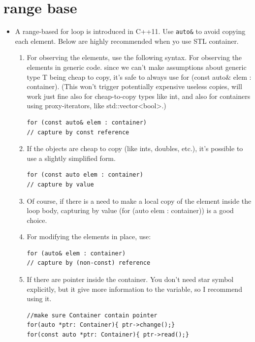 \documentclass[a4paper,11pt,twoside]{book}
\begin{document}
\section{range base}
\begin{itemize}
	
	\item A range-based for loop is introduced in C++11. Use \texttt{auto\&} to avoid copying each element. Below are highly recommended when yo use STL container.
	
	\begin{enumerate}
		\item For observing the elements, use the following syntax. For observing the elements in generic code. since we can't make assumptions about generic type T being cheap to copy, it's safe to always use for (const auto\& elem : container).
		(This won't trigger potentially expensive useless copies, will work just fine also for cheap-to-copy types like int, and also for containers using proxy-iterators, like std::vector<bool>.)
\begin{lstlisting}[numbers=none]
for (const auto& elem : container)    
// capture by const reference
\end{lstlisting}	
		
		
		\item If the objects are cheap to copy (like ints, doubles, etc.), it's possible to use a slightly simplified form. 
		
\begin{lstlisting}[numbers=none]
for (const auto elem : container)   
// capture by value
\end{lstlisting}            
		
		\item Of course, if there is a need to make a local copy of the element inside the loop body, capturing by value (for (auto elem : container)) is a good choice.
		
		\item For modifying the elements in place, use:
\begin{lstlisting}[numbers=none]
for (auto& elem : container)    
// capture by (non-const) reference
\end{lstlisting}
		
		\item If there are pointer inside the container. You don't need star symbol explicitly, but it give more information to the variable, so I recommend using it.
\begin{lstlisting}[numbers=none]
//make sure Container contain pointer
for(auto *ptr: Container){ ptr->change();}
for(const auto *ptr: Container){ ptr->read();}
\end{lstlisting}
		

\end{enumerate}
\end{itemize}
\end{document}
